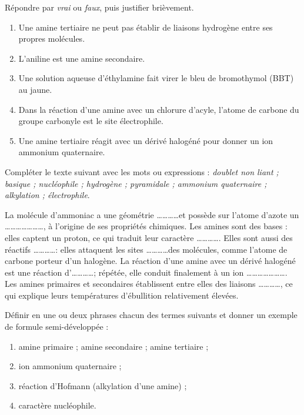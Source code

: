 \documentclass[11pt]{article}
\begin{document}
\begin{exercice}
Répondre par \emph{vrai} ou \emph{faux}, puis justifier brièvement.
\begin{enumerate}
\item Une amine tertiaire ne peut pas établir de liaisons hydrogène entre ses propres molécules.
\item L'aniline  est une amine secondaire.
\item Une solution aqueuse d'éthylamine fait virer le bleu de bromothymol (BBT) au jaune.
\item Dans la réaction d'une amine avec un chlorure d'acyle, l'atome de carbone du groupe carbonyle est le site électrophile.
\item Une amine tertiaire réagit avec un dérivé halogéné pour donner un ion ammonium quaternaire.
\end{enumerate}
\end{exercice}

\begin{exercice}
Compléter le texte suivant avec les mots ou expressions : \emph{doublet non liant ; basique ; nucléophile ; hydrogène ; pyramidale ; ammonium quaternaire ; alkylation ; électrophile}.

La molécule d'ammoniac a une géométrie \ldots\ldots\ldots\ldots et possède sur l'atome d'azote un \ldots\ldots\ldots\ldots\ldots\ldots\ldots, à l'origine de ses propriétés chimiques. Les amines sont des bases : elles captent un proton, ce qui traduit leur caractère \ldots\ldots\ldots\ldots. Elles sont aussi des réactifs \ldots\ldots\ldots\ldots : elles attaquent les sites \ldots\ldots\ldots\ldots des molécules, comme l'atome de carbone porteur d'un halogène. La réaction d'une amine avec un dérivé halogéné est une réaction d'\ldots\ldots\ldots\ldots ; répétée, elle conduit finalement à un ion \ldots\ldots\ldots\ldots\ldots\ldots\ldots. Les amines primaires et secondaires établissent entre elles des liaisons \ldots\ldots\ldots\ldots, ce qui explique leurs températures d'ébullition relativement élevées.
\end{exercice}

\begin{exercice}[Définitions]
Définir en une ou deux phrases chacun des termes suivants et donner un exemple de formule semi-développée :
\begin{enumerate}
\item amine primaire ; amine secondaire ; amine tertiaire ;
\item ion ammonium quaternaire ;
\item réaction d'Hofmann (alkylation d'une amine) ;
\item caractère nucléophile.
\end{enumerate}
\end{exercice}
\end{document}
